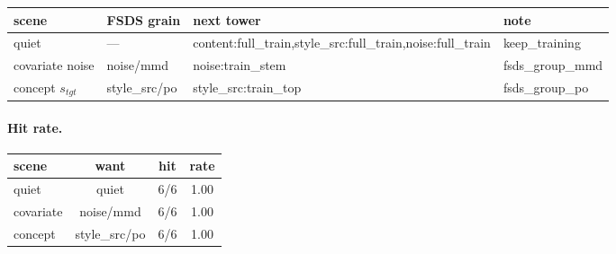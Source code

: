\begin{tabular}{@{}llll@{}}
\toprule
scene & FSDS grain & next tower & note \\
\midrule
quiet & --- & content:full_train,style_src:full_train,noise:full_train & keep_training \\
covariate noise & noise/mmd & noise:train_stem & fsds_group_mmd \\
concept $s_{tgt}$ & style_src/po & style_src:train_top & fsds_group_po \\
\bottomrule
\end{tabular}
\vspace{1.2em}
\paragraph{Hit rate.}
\begin{tabular}{@{}lccc@{}}
\toprule
scene & want & hit & rate \\
\midrule
quiet & quiet & 6/6 & 1.00 \\
covariate & noise/mmd & 6/6 & 1.00 \\
concept & style_src/po & 6/6 & 1.00 \\
\bottomrule
\end{tabular}